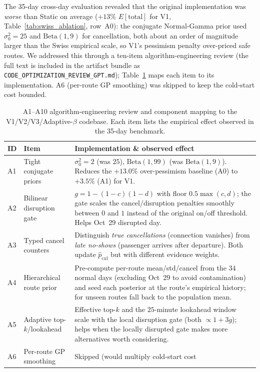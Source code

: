\documentclass[11pt]{article}
\theoremstyle{definition}
\theoremstyle{remark}
\begin{document}
The 35-day cross-day evaluation revealed that the original
implementation was \emph{worse} than Static on average ($+13\%$
$E[\mathrm{total}]$ for V1, Table~\ref{tab:swiss_ablation}, row~A0):
the conjugate Normal-Gamma prior used $\sigma_0^2{=}25$ and
$\mathrm{Beta}(1,9)$ for cancellation, both about an order of
magnitude larger than the Swiss empirical scale, so V1's pessimism
penalty over-priced safe routes. We addressed this through a
ten-item algorithm-engineering review (the full text is included
in the artifact bundle as
\texttt{CODE\_OPTIMIZATION\_REVIEW\_GPT.md}); Table~\ref{tab:a1a10}
maps each item to its implementation. A6 (per-route GP smoothing)
was skipped to keep the cold-start cost bounded.

\begin{table}[!htbp]
\centering
\caption{A1--A10 algorithm-engineering review and component mapping
to the V1/V2/V3/Adaptive-$\beta$ codebase. Each item lists the
empirical effect observed in the 35-day benchmark.}
\label{tab:a1a10}
\scriptsize
\begin{tabular}{l p{3.4cm} p{5.6cm}}
\toprule
ID & Item & Implementation \& observed effect \\
\midrule
A1 & Tight conjugate priors  & $\sigma_0^2=2$ (was $25$),
$\mathrm{Beta}(1,99)$ (was $\mathrm{Beta}(1,9)$). Reduces the
$+13.0\%$ over-pessimism baseline (A0) to $+3.5\%$ (A1) for V1. \\
A2 & Bilinear disruption gate & $g = 1{-}(1{-}c)(1{-}d)$ with floor
$0.5\max(c,d)$; the gate scales the cancel/disruption penalties
smoothly between $0$ and $1$ instead of the original on/off
threshold. Helps Oct~29 disrupted day. \\
A3 & Typed cancel counters    & Distinguish \emph{true cancellations}
(connection vanishes) from \emph{late no-shows} (passenger arrives
after departure). Both update $\hat p_{\mathrm{cxl}}$ but with
different evidence weights. \\
A4 & Hierarchical route prior & Pre-compute per-route mean/std/cancel
from the $34$ normal days (excluding Oct~29 to avoid contamination)
and seed each posterior at the route's empirical history; for unseen
routes fall back to the population mean. \\
A5 & Adaptive top-$k$/lookahead & Effective top-$k$ and the
$25$-minute lookahead window scale with the local disruption gate
(both $\propto 1{+}3g$); helps when the locally disrupted gate makes
more alternatives worth considering. \\
A6 & Per-route GP smoothing & Skipped (would multiply cold-start cost

\end{tabular}
\end{table}
\end{document}
